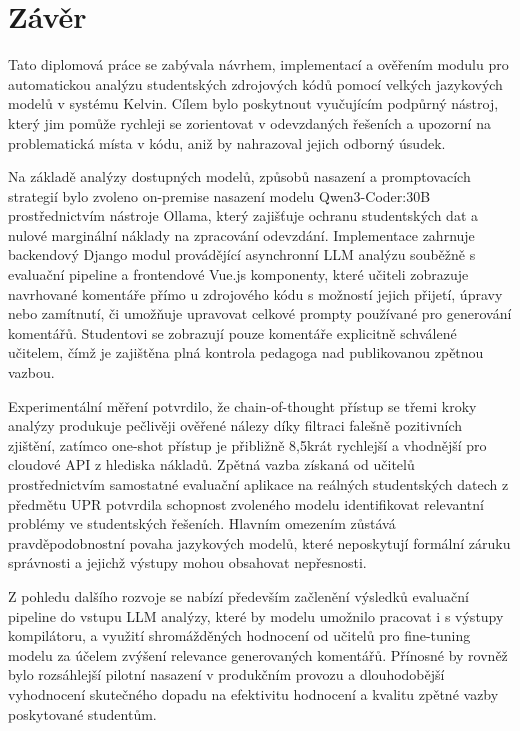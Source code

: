 \chapter{Závěr}
\label{ch:conclusion}

Tato diplomová práce se zabývala návrhem, implementací a ověřením modulu pro automatickou analýzu studentských zdrojových kódů pomocí velkých jazykových modelů v systému Kelvin.
Cílem bylo poskytnout vyučujícím podpůrný nástroj, který jim pomůže rychleji se zorientovat v odevzdaných řešeních a upozorní na problematická místa v kódu, aniž by nahrazoval jejich odborný úsudek.

Na základě analýzy dostupných modelů, způsobů nasazení a promptovacích strategií bylo zvoleno on-premise nasazení modelu Qwen3-Coder:30B prostřednictvím nástroje Ollama, který zajišťuje ochranu studentských dat a nulové marginální náklady na zpracování odevzdání.
Implementace zahrnuje backendový Django modul provádějící asynchronní LLM analýzu souběžně s evaluační pipeline a frontendové Vue.js komponenty, které učiteli zobrazuje navrhované komentáře přímo u zdrojového kódu s možností jejich přijetí, úpravy nebo zamítnutí, či umožňuje upravovat celkové prompty používané pro generování komentářů.
Studentovi se zobrazují pouze komentáře explicitně schválené učitelem, čímž je zajištěna plná kontrola pedagoga nad publikovanou zpětnou vazbou.

Experimentální měření potvrdilo, že chain-of-thought přístup se třemi kroky analýzy produkuje pečlivěji ověřené nálezy díky filtraci falešně pozitivních zjištění, zatímco one-shot přístup je přibližně 8,5krát rychlejší a vhodnější pro cloudové API z hlediska nákladů.
Zpětná vazba získaná od učitelů prostřednictvím samostatné evaluační aplikace na reálných studentských datech z předmětu UPR potvrdila schopnost zvoleného modelu identifikovat relevantní problémy ve studentských řešeních.
Hlavním omezením zůstává pravděpodobnostní povaha jazykových modelů, které neposkytují formální záruku správnosti a jejichž výstupy mohou obsahovat nepřesnosti.

Z pohledu dalšího rozvoje se nabízí především začlenění výsledků evaluační pipeline do vstupu LLM analýzy, které by modelu umožnilo pracovat i s výstupy kompilátoru, a využití shromážděných hodnocení od učitelů pro fine-tuning modelu za účelem zvýšení relevance generovaných komentářů.
Přínosné by rovněž bylo rozsáhlejší pilotní nasazení v produkčním provozu a dlouhodobější vyhodnocení skutečného dopadu na efektivitu hodnocení a kvalitu zpětné vazby poskytované studentům.

\endinput